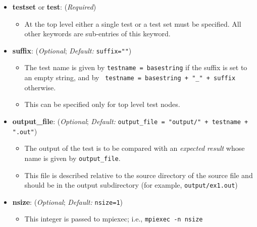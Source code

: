 \begin{itemize}

  \item[] \textbf{testset} or \textbf{test}: (\emph{Required})

    \begin{itemize}

      \item[] At the top level either a single test or a test set must
            be specified.   All other keywords are sub-entries of this keyword.

    \end{itemize}

  \item[]  \textbf{suffix}: (\emph{Optional}; \emph{Default:} \lstinline{suffix=""})
    \begin{itemize}

      \item The test name is given by  \lstinline{testname = basestring} if the suffix is set to an empty string, and by \lstinline{ testname = basestring + "_" + suffix} otherwise.

      \item This can  be specified only for top level test nodes.

     \end{itemize}


   \item[]  \textbf{output\_file}: (\emph{Optional}; \emph{Default:}
                 \lstinline{output_file = "output/" + testname + ".out"})
      \begin{itemize}

      \item The output of the test is to be compared with an \emph{expected result}
      whose name is given by \lstinline{output_file}.

      \item This file is described relative to the source directory of the
      source file and should be in the output subdirectory (for example,
      \lstinline{output/ex1.out})

      \end{itemize}


    \item[]  \textbf{nsize}: (\emph{Optional}; \emph{Default:} \lstinline{nsize=1})
      \begin{itemize}

      \item This integer is passed to mpiexec; i.e., \lstinline{mpiexec -n nsize}


\end{itemize}
\end{itemize}
